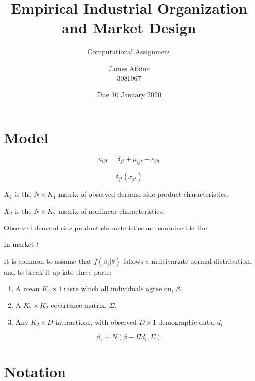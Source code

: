 \documentclass[parskip=half]{scrartcl}
\title{Empirical Industrial Organization and Market Design}
\subtitle{Computational Assignment}
\author{James Atkins \\ 3081967}
\date{Due 10 January 2020}
\begin{document}
	
\maketitle


\section{Model}


\begin{equation}
u_{ijt} = \delta_{jt} + \mu_{ijt} + \epsilon_{ijt}
\end{equation}

\begin{equation}
\delta_{jt}(x_{jt})
\end{equation}

\(X_1\) is the \(N \times K_1\) matrix of observed demand-side product characteristics.

\(X_2\) is the \(N \times K_2\) matrix of nonlinear characteristics. 

Observed demand-side product characteristics are contained in the 


In market \(t\)



It is common to assume that \(f(\beta_i|\theta)\) follows a multivariate normal distribution, and to break it up into three parts:

\begin{enumerate}
\item A mean \(K_1 \times 1\) taste which all individuals agree on, \(\beta\).
\item A \(K_2 \times K_2\) covariance matrix, \(\Sigma\).
\item Any \(K_2 \times D\) interactions, with observed \(D \times 1\) demographic data, \(d_i\)
\end{enumerate}

\begin{equation}
\beta_i \sim N(\beta + \Pi d_i, \Sigma)
\end{equation}


\section{Notation}
\end{document}
